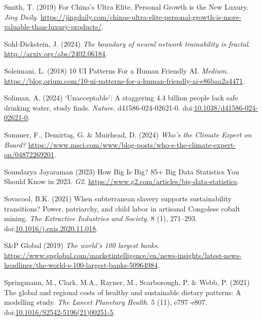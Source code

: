 \documentclass[
  letterpaper,
  DIV=11,
  numbers=noendperiod]{scrartcl}
\newlength{\cslhangindent}
\newenvironment{CSLReferences}[2] %
 {\begin{list}{}{%
  \setlength{\itemindent}{0pt}
  \setlength{\leftmargin}{0pt}
  \setlength{\parsep}{0pt}
  \ifodd #1
   \setlength{\leftmargin}{\cslhangindent}
   \setlength{\itemindent}{-1\cslhangindent}
  \fi
  \setlength{\itemsep}{#2\baselineskip}}}
 {\end{list}}
\begin{document}
\begin{CSLReferences}{0}{1}
Smith, T. (2019) For {China}'s {Ultra Elite}, {Personal Growth} is the
{New Luxury}. \emph{Jing Daily}.
\url{https://jingdaily.com/chinas-ultra-elite-personal-growth-is-more-valuable-than-luxury-products/}.

Sohl-Dickstein, J. (2024) \emph{The boundary of neural network
trainability is fractal}. \url{http://arxiv.org/abs/2402.06184}.

Soleimani, L. (2018) 10 {UI Patterns For} a {Human Friendly AI}.
\emph{Medium}.
\url{https://blog.orium.com/10-ui-patterns-for-a-human-friendly-ai-e86baa2a4471}.

Soliman, A. (2024) {`{Unacceptable}'}: A staggering 4.4 billion people
lack safe drinking water, study finds. \emph{Nature}.
d41586-024-02621-0.
doi:\href{https://doi.org/10.1038/d41586-024-02621-0}{10.1038/d41586-024-02621-0}.

Sommer, F., Demirtaş, G. \& Muirhead, D. (2024) \emph{Who's the {Climate
Expert} on {Board}?}
\url{https://www.msci.com/www/blog-posts/who-s-the-climate-expert-on/04872269201}.

Soundarya Jayaraman (2023) How {Big Is Big}? 85+ {Big Data Statistics
You Should Know} in 2023. \emph{G2}.
\url{https://www.g2.com/articles/big-data-statistics}.

Sovacool, B.K. (2021) When subterranean slavery supports sustainability
transitions? Power, patriarchy, and child labor in artisanal {Congolese}
cobalt mining. \emph{The Extractive Industries and Society}. 8 (1),
271--293.
doi:\href{https://doi.org/10.1016/j.exis.2020.11.018}{10.1016/j.exis.2020.11.018}.

S\&P Global (2019) \emph{The world's 100 largest banks}.
\url{https://www.spglobal.com/marketintelligence/en/news-insights/latest-news-headlines/the-world-s-100-largest-banks-50964984}.

Springmann, M., Clark, M.A., Rayner, M., Scarborough, P. \& Webb, P.
(2021) The global and regional costs of healthy and sustainable dietary
patterns: A modelling study. \emph{The Lancet Planetary Health}. 5 (11),
e797--e807.
doi:\href{https://doi.org/10.1016/S2542-5196(21)00251-5}{10.1016/S2542-5196(21)00251-5}.


\end{CSLReferences}
\end{document}
